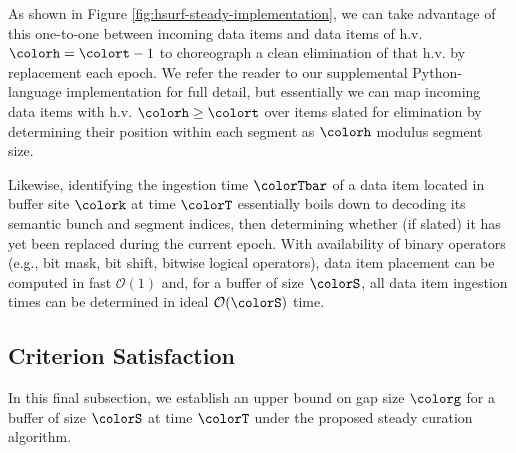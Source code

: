 As shown in Figure \ref{fig:hsurf-steady-implementation}, we can take advantage of this one-to-one between incoming data items and data items of h.v. $\colorh=\colort-1$ to choreograph a clean elimination of that h.v. by replacement each epoch.
We refer the reader to our supplemental Python-language implementation for full detail, but essentially we can map incoming data items with h.v. $\colorh \geq \colort$ over items slated for elimination by determining their position within each segment as $\colorh$ modulus segment size.



Likewise, identifying the ingestion time $\colorTbar$ of a data item located in buffer site $\colork$ at time $\colorT$ essentially boils down to decoding its semantic bunch and segment indices, then determining whether (if slated) it has yet been replaced during the current epoch.
With availability of binary operators (e.g., bit mask, bit shift, bitwise logical operators), data item placement can be computed in fast $\mathcal{O}(1)$ and, for a buffer of size $\colorS$, all data item ingestion times can be determined in ideal $\mathcal{O}(\colorS)$ time.

\subsection{Criterion Satisfaction}

In this final subsection, we establish an upper bound on gap size $\colorg$ for a buffer of size $\colorS$ at time $\colorT$ under the proposed steady curation algorithm.


